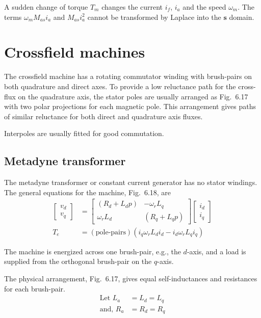 \documentclass[a4paper,numbers=noenddot,12pt]{scrbook}
\begin{document}
A sudden change of torque $T_m$ changes the current $i_f$, $i_a$ and the speed $\omega_m$. The terms $\omega_m M_{as} i_a$ and $M_{as}i_a^2$ cannot be transformed by Laplace into the $\textbf{s}$ domain.

\section{Crossfield machines}
The crossfield machine has a rotating commutator winding with brush-pairs on both quadrature and direct axes. To provide a low reluctance path for the cross-flux on the quadrature axis, the stator poles are usually arranged as Fig.\ 6.17 with two polar projections for each magnetic pole. This arrangement gives paths of similar reluctance for both direct and quadrature axis fluxes.

Interpoles are usually fitted for good commutation.

\subsection{Metadyne transformer}
The metadyne transformer or constant current generator has no stator windings. The general equations for the machine, Fig.\ 6.18, are
\begin{align}
    \begin{bmatrix}
        v_d \\ v_q
    \end{bmatrix}
    & = 
    \begin{bmatrix}
        (R_d + L_d p) & - \omega_r L_q \\
        \omega_r L_d & (R_q + L_q p)
    \end{bmatrix}
    \begin{bmatrix}
        i_d \\ i_q
    \end{bmatrix} \\
    T_e & = (\text{pole-pairs})(i_q \omega_r L_d i_d - i_d \omega_r L_q i_q) 
    \label{eq:Eq6.77}
\end{align}

The machine is energized across one brush-pair, e.g., the $d$-axis, and a load is supplied from the orthogonal brush-pair on the $q$-axis.

The physical arrangement, Fig.\ 6.17, gives equal self-inductances and resistances for each brush-pair.
\begin{align*}
    \text{Let } L_a & = L_d = L_q \\
    \text{and, } R_a & = R_d = R_q 
    \label{}
\end{align*}
\end{document}
